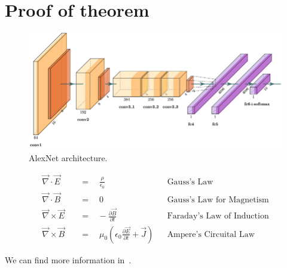 \chapter{Proof of theorem}\label{app:Proof of theorem}
\lipsum[1]
\begin{figure}[thbp]
    \centering
    \includegraphics[width=\textwidth]{img/appendixA/alexnet.png}
    \caption{AlexNet architecture.}\label{fig:alexnet}
\end{figure}
\lipsum[1]
\begin{align}
     \vec{\nabla} \cdot \vec{E} \quad &=\quad\frac{\rho}{\epsilon_0} &&\text{Gauss's Law} \\      
    \vec{\nabla} \cdot \vec{B} \quad &=\quad 0 &&\text{Gauss's Law for Magnetism}\\
    \vec{\nabla} \times \vec{E} \quad &=\hspace{10pt}-\frac{\partial{\vec{B}}}{\partial{t}} &&\text{Faraday's Law of Induction} \\ 
    \vec{\nabla} \times \vec{B} \quad &=\quad \mu_0\left( \epsilon_0\frac{\partial{\vec{E}}}{\partial{t}}+\vec{J}\right) &&\text{Ampere's Circuital Law}
\end{align}

We can find more information in~\cite{li2018deep}.